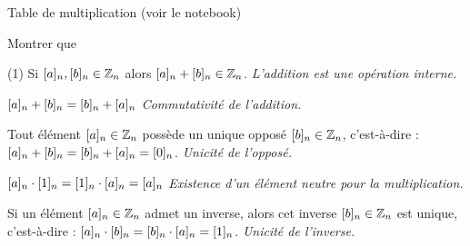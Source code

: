 \begin{exstheorie}
\begin{tasks}[label=\alph*),item-indent=6mm,column-sep=0mm ,after-item-skip=1mm,label-offset=2mm,label-align=right]
	\end{tasks}
	
	\exordi Table de multiplication  (voir le notebook)
	
	\eexo
	
	\pagebreak[1]
	\exo
	Montrer que
	
	\begin{tasks}[label=\alph*),item-indent=6mm,column-sep=0mm ,after-item-skip=1mm,label-offset=2mm,label-align=right](1)
		\task Si $[a]_{n}, [b]_{n} \in \mathbb{Z}_n$ alors $[a]_{n} + [b]_{n} \in \mathbb{Z}_n$. \hfill \textit{L'addition est une opération interne.}
		
		\task $[a]_{n} + [b]_{n} = [b]_{n} + [a]_{n}$ \hfill \textit{Commutativité de l'addition.}
		
		\task Tout élément $[a]_{n} \in \mathbb{Z}_n$ possède un unique opposé $[b]_{n} \in \mathbb{Z}_n$, c'est-à-dire : $[a]_{n} + [b]_{n} = [b]_{n} + [a]_{n} = [0]_{n}$. \hfill \textit{Unicité de l'opposé.}
		
		\task $[a]_{n} \cdot [1]_{n} = [1]_{n} \cdot [a]_{n} = [a]_{n}$ \hfill \textit{Existence d'un élément neutre pour la multiplication.}
		
		\task Si un élément $[a]_{n} \in \mathbb{Z}_n$ admet un inverse, alors cet inverse $[b]_{n} \in \mathbb{Z}_n$ est unique, c'est-à-dire : $[a]_{n} \cdot [b]_{n} = [b]_{n} \cdot [a]_{n} = [1]_{n}$. \hfill \textit{Unicité de l'inverse.}
		
	\end{tasks}
	
	

\end{exstheorie}

\pagebreak

